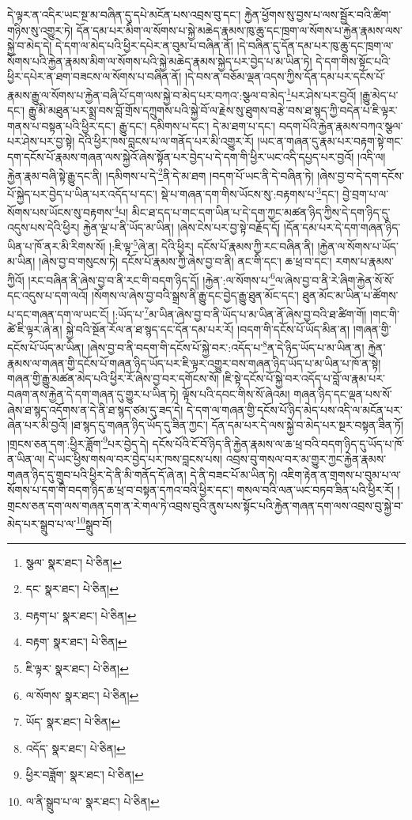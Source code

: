 དེ་ལྟར་ན་འདིར་ཡང་སྔ་མ་བཞིན་དུ་དཔེ་མངོན་པས་འབྲས་བུ་དང་། རྐྱེན་ཕྱོགས་སུ་བྱས་པ་ལས་སྦྱོར་བའི་ཚིག་གཉིས་སུ་འགྱུར་ཏེ། དོན་དམ་པར་མིག་ལ་སོགས་པ་སྐྱེ་མཆེད་རྣམས་ཁུ་ཆུ་དང་ཁྲག་ལ་སོགས་པ་རྐྱེན་རྣམས་ལས་སྐྱེ་བ་མེད་དེ། དེ་དག་ལ་མེད་པའི་ཕྱིར་དཔེར་ན་བུམ་པ་བཞིན་ནོ། །དེ་བཞིན་དུ་དོན་དམ་པར་ཁུ་ཆུ་དང་ཁྲག་ལ་སོགས་པའི་རྐྱེན་རྣམས་མིག་ལ་སོགས་པའི་སྐྱེ་མཆེད་རྣམས་སྐྱེད་པར་བྱེད་པ་མ་ཡིན་ཏེ། དེ་དག་གིས་སྟོང་པའི་ཕྱིར་དཔེར་ན་ཐག་བཟངས་ལ་སོགས་པ་བཞིན་ནོ། །དེ་བས་ན་བཅོམ་ལྡན་འདས་ཀྱིས་དོན་དམ་པར་དངོས་པོ་རྣམས་རྒྱུ་ལ་སོགས་པ་རྐྱེན་བཞི་པོ་དག་ལས་སྐྱེ་བ་མེད་པར་བཀའ་:སྩལ་བ་མེད་\footnote{སྩལ་  སྣར་ཐང་།  པེ་ཅིན། }པར་ཤེས་པར་བྱའོ། །རྒྱུ་མེད་པ་དང་། རྒྱུ་མི་མཐུན་པར་སྨྲ་བས་བློ་གྲོས་དཀྲུགས་པའི་སྐྱེ་བོ་ལ་རྗེས་སུ་ཐུགས་བརྩེ་བས་ཐ་སྙད་ཀྱི་བདེན་པ་ཇི་ལྟར་གནས་པ་བསྟན་པའི་ཕྱིར་དང་། རྒྱུ་དང་། དམིགས་པ་དང་། དེ་མ་ཐག་པ་དང་། བདག་པོའི་རྐྱེན་རྣམས་བཀའ་སྩལ་པར་ཤེས་པར་བྱ་སྟེ། དེའི་ཕྱིར་ཁས་བླངས་པ་ལ་གནོད་པར་མི་འགྱུར་རོ། །ཡང་ན་གཞན་དུ་རྣམ་པར་བརྟག་སྟེ་གང་དག་དངོས་པོ་རྣམས་གཞན་ལས་སྐྱེའོ་ཞེས་སྟོན་པར་བྱེད་པ་དེ་དག་གི་ཕྱིར་ཡང་འདི་དཔྱད་པར་བྱའོ། །འདི་ལ། རྐྱེན་རྣམ་བཞི་སྟེ་རྒྱུ་དང་ནི། །དམིགས་པ་དེ་\footnote{དང་  སྣར་ཐང་།  པེ་ཅིན། }ནི་དེ་མ་ཐག །བདག་པོ་ཡང་ནི་དེ་བཞིན་ཏེ། །ཞེས་བྱ་བ་དེ་དག་དངོས་པོ་སྐྱེད་པར་བྱེད་པ་ཡིན་པར་འདོད་པ་དང་། སྡེ་པ་གཞན་དག་གིས་ཡོངས་སུ་:བརྟགས་པ་\footnote{བརྟག་པ་  སྣར་ཐང་།  པེ་ཅིན། }དང་། བྱེ་བྲག་པ་ལ་སོགས་པས་ཡོངས་སུ་བརྟགས་\footnote{བརྟག་  སྣར་ཐང་།  པེ་ཅིན། }པ། མིང་ཐ་དད་པ་གང་དག་ཡིན་པ་དེ་དག་ཀྱང་མཚན་ཉིད་ཀྱིས་དེ་དག་ཉིད་དུ་འདུས་པས་དེའི་ཕྱིར། རྐྱེན་ལྔ་པ་ནི་ཡོད་མ་ཡིན། །ཞེས་ངེས་པར་བྱ་སྟེ་བརྗོད་དོ། །དོན་དམ་པར་དེ་དག་གཞན་ཉིད་ཡིན་པ་ཁོ་ནར་མི་རིགས་སོ། །:ཇི་ལྟ་\footnote{ཇི་ལྟར་  སྣར་ཐང་།  པེ་ཅིན། }ཞེ་ན། དེའི་ཕྱིར། དངོས་པོ་རྣམས་ཀྱི་རང་བཞིན་ནི། །རྐྱེན་ལ་སོགས་པ་ཡོད་མ་ཡིན། །ཞེས་བྱ་བ་གསུངས་ཏེ། དངོས་པོ་རྣམས་ཀྱི་ཞེས་བྱ་བ་ནི། ནང་གི་དང་། ཆ་ཕྲ་བ་དང་། རགས་པ་རྣམས་ཀྱིའོ། །རང་བཞིན་ནི་ཞེས་བྱ་བ་ནི་རང་གི་བདག་ཉིད་དོ། །རྐྱེན་:ལ་སོགས་པ་\footnote{ལ་སོགས་  སྣར་ཐང་།  པེ་ཅིན། }ལ་ཞེས་བྱ་བ་ནི་རེ་ཞིག་རྐྱེན་སོ་སོ་དང་འདུས་པ་དག་ལའོ། །སོགས་ལ་ཞེས་བྱ་བའི་སྒྲས་ནི་རྒྱུ་དང་བྱེད་རྒྱུ་ཐུན་མོང་དང་། ཐུན་མོང་མ་ཡིན་པ་ཚོགས་པ་དང་གཞན་དག་ལ་ཡང་ངོ། །:ཡོད་པ་\footnote{ཡོད་  སྣར་ཐང་།  པེ་ཅིན། }མ་ཡིན་ཞེས་བྱ་བ་ནི་ཡོད་པ་མ་ཡིན་ནོ་ཞེས་བྱ་བའི་ཐ་ཚིག་གོ། །གང་གི་ཚེ་ཇི་ལྟར་ཞེ་ན། སྐྱེ་བའི་སྔོན་རོལ་ན་ཐ་སྙད་དང་དོན་དམ་པར་རོ། །བདག་གི་དངོས་པོ་ཡོད་མིན་ན། །གཞན་གྱི་དངོས་པོ་ཡོད་མ་ཡིན། །ཞེས་བྱ་བ་ནི་བདག་གི་དངོས་པོ་སྐྱེ་བར་:འདོད་པ་\footnote{འདོད་  སྣར་ཐང་།  པེ་ཅིན། }ན་དེ་ཉིད་ཡོད་པ་མ་ཡིན་ན། རྐྱེན་རྣམས་ལ་གཞན་གྱི་དངོས་པོ་གཞན་ཉིད་ཡོད་པར་ཇི་ལྟར་འགྱུར་བས་གཞན་ཉིད་ཡོད་པ་མ་ཡིན་པ་ཁོ་ན་སྟེ། གཞན་གྱི་རྒྱུ་མཚན་མེད་པའི་ཕྱིར་རོ་ཞེས་བྱ་བར་དགོངས་སོ། །ཇི་སྟེ་དངོས་པོ་སྐྱེ་བར་འདོད་པ་བློ་ལ་རྣམ་པར་བཞག་ནས་རྐྱེན་དེ་དག་གཞན་དུ་གྱུར་པ་ཡིན་ཏེ། ལྟོས་པའི་དབང་གིས་སོ་ཞེའམ། གཞན་ཉིད་དང་ལྡན་པས་སོ་ཞེས་ཐ་སྙད་འདོགས་ན་དེ་ནི་ཐ་སྙད་ཙམ་དུ་ཟད་དེ། དེ་དག་ལ་གཞན་གྱི་དངོས་པོ་ཉིད་མེད་པས་འདི་ལ་མངོན་པར་ཞེན་པར་མི་བྱའོ། །ཐ་སྙད་དུ་གཞན་ཉིད་ཡོད་དུ་ཟིན་ཀྱང་། དོན་དམ་པར་དེ་ལས་སྐྱེ་བ་མེད་པར་སྔར་བསྟན་ཟིན་ཏོ། །གྲངས་ཅན་དག་:ཕྱིར་ཟློག་\footnote{ཕྱིར་བཟློག་  སྣར་ཐང་།  པེ་ཅིན། }པར་བྱེད་དེ། དངོས་པོའི་ངོ་བོ་ཉིད་ནི་རྐྱེན་རྣམས་ལ་ཆ་ཕྲ་བའི་བདག་ཉིད་དུ་ཡོད་པ་ཁོ་ན་ཡིན་ལ། དེ་ཡང་ཕྱིས་གསལ་བར་བྱེད་པར་ཁས་བླངས་པས། འབྲས་བུ་གསལ་བར་མ་གྱུར་ཀྱང་རྐྱེན་རྣམས་གཞན་ཉིད་དུ་གྲུབ་པའི་ཕྱིར་དེ་ནི་མི་གནོད་དོ་ཞེ་ན། དེ་ནི་བཟང་པོ་མ་ཡིན་ཏེ། འཇིག་རྟེན་ན་གྲགས་པ་བུམ་པ་ལ་སོགས་པ་དག་གི་བདག་ཉིད་ཆ་ཕྲ་བ་བསྟན་དཀའ་བའི་ཕྱིར་དང་། གསལ་བའི་ལན་ཡང་བཏབ་ཟིན་པའི་ཕྱིར་རོ། །གྲངས་ཅན་དག་ལས་གཞན་དག་ན་རེ་གལ་ཏེ་འབྲས་བུའི་ནུས་པས་སྟོང་པའི་རྐྱེན་གཞན་དག་ལས་འབྲས་བུ་སྐྱེ་བ་མེད་པར་སྒྲུབ་པ་ལ་\footnote{ལ་ནི་སྒྲུབ་པ་ལ་  སྣར་ཐང་།  པེ་ཅིན། }སྒྲུབ་བོ། 
